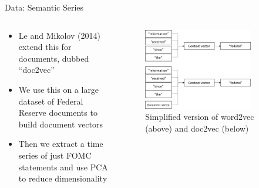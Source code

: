 \documentclass[9pt]{beamer}
\begin{document}
	\begin{frame}{Data: Semantic Series}
		
		\begin{columns}
			\begin{column}{0.5\textwidth}
				\begin{itemize}
					\item Le and Mikolov (2014) extend this for documents, dubbed ``doc2vec''
					\item We use this on a large dataset of Federal Reserve documents to build document vectors
					\item Then we extract a time series of just FOMC statements and use PCA to reduce dimensionality
				\end{itemize}
			\end{column}
			\begin{column}{0.5\textwidth}
				\begin{figure}
					\includegraphics[width=0.8\textwidth]{doc2vec.png}
					\caption{Simplified version of word2vec (above) and doc2vec (below)}
				\end{figure}
			\end{column}
		\end{columns}
		
		
	\end{frame}
\end{document}
